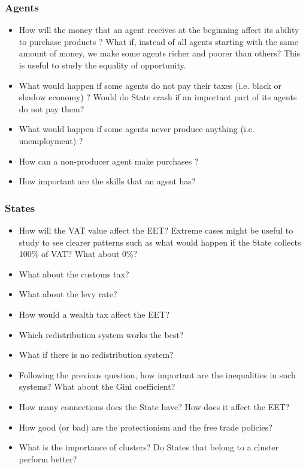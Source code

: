 \subsubsection{Agents}

\begin{itemize}
    \item How will the money that an agent receives at the beginning affect its ability to purchase products ? What if, instead of all agents starting with the same amount of money, we make some agents richer and poorer than others? This is useful to study the equality of opportunity.
    \item What would happen if some agents do not pay their taxes (i.e. black or shadow economy) ? Would do State crash if an important part of its agents do not pay them? 
    \item What would happen if some agents never produce anything (i.e. unemployment) ?
    \item How can a non-producer agent make purchases ?
    \item How important are the skills that an agent has? 
\end{itemize}

\subsubsection{States}

\begin{itemize}
    \item How will the VAT value affect the EET? Extreme cases might be useful to study to see clearer patterns such as what would happen if the State collects 100\% of VAT? What about 0\%?
    \item What about the customs tax?
    \item What about the levy rate?
    \item How would a wealth tax affect the EET?
    \item Which redistribution system works the best?
    \item What if there is no redistribution system?
    \item Following the previous question, how important are the inequalities in such systems? What about the Gini coefficient? 
    \item How many connections does the State have? How does it affect the EET?
    \item How good (or bad) are the protectionism and the free trade policies?
    \item What is the importance of clusters? Do States that belong to a cluster perform better?
\end{itemize}

